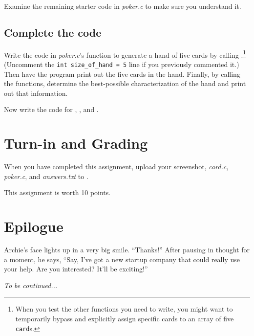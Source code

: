 Examine the remaining starter code in \textit{poker.c} to make sure you
understand it.

\subsection{Complete the code}

Write the code in \textit{poker.c}'s  function to generate a
hand of five cards by calling .\footnote{When you test the
other functions you need to write, you might want to temporarily bypass
 and explicitly assign specific cards to an array of five
\lstinline{card}s.}  (Uncomment the \lstinline{int size_of_hand = 5} line if you
previously commented it.)  Then have the program print out the five cards in
the hand. Finally, by calling the  functions, determine the
best-possible characterization of the hand and print out that information.

Now write the code for , , and
.

\section{Turn-in and Grading}

When you have completed this assignment, upload your screenshot,
\textit{card.c}, \textit{poker.c}, and \textit{answers.txt} to \filesubmission.

This assignment is worth 10 points.
\begin{description}
\item[Penalties]
\end{description}

\section*{Epilogue}

Archie's face lights up in a very big smile. ``Thanks!'' After pausing in
thought for a moment, he says, ``Say, I've got a new startup company that could
really use your help. Are you interested? It'll be exciting!''

\textit{To be continued...}


